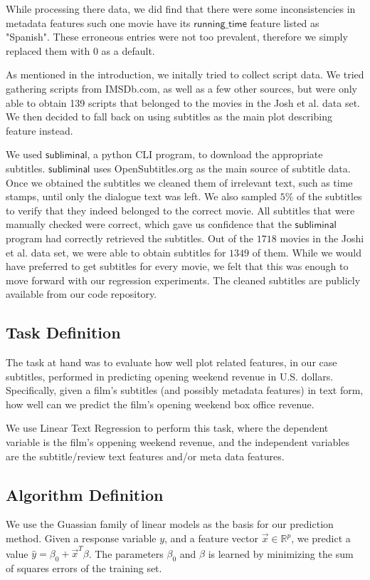 \documentclass[11pt]{article}
\begin{document}
While processing there data, we 
did find that there were some inconsistencies in metadata features such one movie
have its $\mathsf{running\_time}$ feature listed as "Spanish". These erroneous entries
were not too prevalent, therefore we simply replaced them with
0 as a default.

As mentioned in the introduction, we initally tried to collect script data. We tried
gathering scripts from IMSDb.com, as well as a few other sources, but were only able
to obtain 139 scripts that belonged to the movies in the Josh et al. data set. We then
decided to fall back on using subtitles as the main plot describing feature instead.

We used $\mathsf{subliminal}$, a python CLI program, to download the appropriate
subtitles. $\mathsf{subliminal}$ uses OpenSubtitles.org as the main source of subtitle
data. Once we obtained the subtitles we cleaned them of irrelevant text, such as time
stamps, until only the dialogue text was left. We also sampled $5$\% of the subtitles to
verify that they indeed belonged to the correct movie. All subtitles that were manually
checked were correct, which gave us confidence that the $\mathsf{subliminal}$ program
had correctly retrieved the subtitles. Out of the $1718$ movies in the Joshi
et al. data set, we were able to obtain subtitles for $1349$ of them.
While we would have preferred to get subtitles for every movie, we felt that this was
enough to move forward with our regression experiments. The cleaned subtitles are
publicly available from our code repository.

\subsection{Task Definition}
The task at hand was to evaluate how well plot related features, in our case subtitles,
performed in predicting opening weekend revenue in U.S. dollars. Specifically, given
a film's subtitles (and possibly metadata features) in text form, how well can we
predict the film's opening weekend box office revenue.

We use Linear Text Regression to perform this task, where the dependent variable is
the film's oppening weekend revenue, and the independent variables are the subtitle/review
text features and/or meta data features.

\subsection{Algorithm Definition}
We use the Guassian family of linear models as the basis for our prediction method.
Given a response variable $y$, and a feature vector $\vec{x} \in \mathbb{R}^p$, we
predict a value $\hat{y} = \beta_0 + \vec{x}^T \beta$. The parameters $\beta_0$ and $\beta$
is learned by minimizing the sum of squares errors of the training set.
\end{document}
